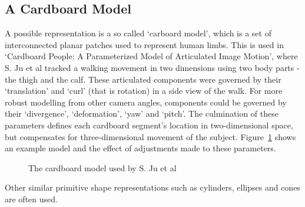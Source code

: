\subsection{A Cardboard Model}

A possible representation is a so called `carboard model', which is a set of interconnected planar patches used to represent human limbs. This is used in `Cardboard People: A Parameterized Model of Articulated Image Motion'\cite{cardboardpeople}, where S. Ju et al tracked a walking movement in two dimensions using two body parts - the thigh and the calf. These articulated components were governed by their `translation' and `curl' (that is rotation) in a side view of the walk. For more robust modelling from other camera angles, components could be governed by their `divergence', `deformation', `yaw' and `pitch'. The culmination of these parameters defines each cardboard segment's location in two-dimensional space, but compensates for three-dimensional movement of the subject. Figure~\ref{fig:cardboardmodel} shows an example model and the effect of adjustments made to these parameters.

\begin{figure}[H]
    \centering
\caption{The cardboard model used by S. Ju et al\cite{cardboardpeople}}
\label{fig:cardboardmodel}
\end{figure}

Other similar primitive shape representations such as cylinders, ellipses and cones are often used\cite{cvmocapsurvey}.